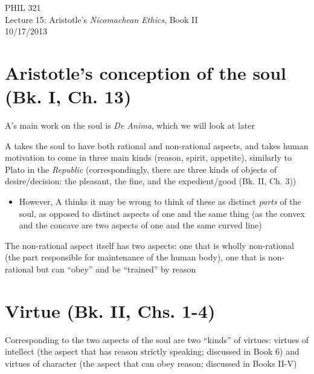 \documentclass[11pt]{article}
\begin{document}
\thispagestyle{empty}
\begin{center} \LARGE{PHIL 321\\ Lecture 15: Aristotle's \emph{Nicomachean Ethics}, Book II}\\ \vspace*{2mm}
\large{10/17/2013}\end{center}
\thispagestyle{empty}\vspace*{3mm}
\vspace*{-8mm}

\section*{Aristotle's conception of the soul (Bk. I, Ch. 13)}

\noindent A's main work on the soul is \emph{De Anima}, which we will look at later
\vspace*{2mm}

\noindent A takes the soul to have both rational and non-rational aspects, and takes human motivation to come in three main kinds (reason, spirit, appetite), similarly to Plato in the \emph{Republic} (correspondingly, there are three kinds of objects of desire/decision: the pleasant, the fine, and the expedient/good (Bk. II, Ch. 3))

\begin{itemize}\item{However, A thinks it may be wrong to think of these as distinct \emph{parts} of the soul, as opposed to distinct aspects of one and the same thing (as the convex and the concave are two aspects of one and the same curved line)}\end{itemize}

\noindent The non-rational aspect itself has two aspects: one that is wholly non-rational (the part responsible for maintenance of the human body), one that is non-rational but can ``obey'' and be ``trained'' by reason
\vspace*{-2mm}

\section*{Virtue (Bk. II, Chs. 1-4)}

\noindent Corresponding to the two aspects of the soul are two ``kinds'' of virtues: virtues of intellect (the aspect that has reason strictly speaking; discussed in Book 6) and virtues of character (the aspect that can obey reason; discussed in Books II-V)
\vspace*{2mm}
\end{document}

